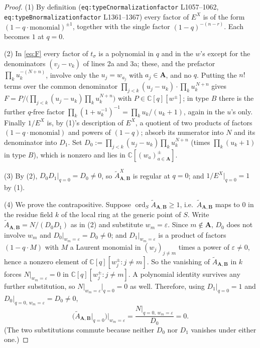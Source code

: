 \documentclass[11pt]{article}
\theoremstyle{plain}
\theoremstyle{definition}
\newcommand{\At}{\widetilde{A}}
\newcommand{\bA}{\mathbf{A}}
\newcommand{\bB}{\mathbf{B}}
\newcommand{\ord}{\operatorname{ord}}
\begin{document}
\begin{proof}
(1) By definition (\texttt{eq:typeCnormalizationfactor} L1057--1062,
\texttt{eq:typeBnormalizationfactor} L1361--1367) every factor of $E^{X}$ is of
the form $(1-q\cdot\text{monomial})^{\pm1}$, together with the single factor
$(1-q)^{-(n-r)}$.  Each becomes $1$ at $q=0$.

(2) In \eqref{eq:F} every factor of $t_\sigma$ is a polynomial in $q$ and in the
$w$'s except for the denominators $(v_j-v_k)$ of lines 2a and 3a; these, and the
prefactor $\prod_k u_k^{-(N+n)}$, involve only the $u_j=w_{a_j}$ with
$a_j\in\bA$, and no $q$.  Putting the $n!$ terms over the common denominator
$\prod_{j<k}(u_j-u_k)\cdot\prod_k u_k^{\,N+n}$ gives
$F=P/\bigl(\prod_{j<k}(u_j-u_k)\prod_k u_k^{N+n}\bigr)$ with
$P\in\mathbb{C}[q][w^{\pm}]$; in type $B$ there is the further $q$-free factor
$\prod_k(1+u_k^{-1})^{-1}=\prod_k u_k/(u_k+1)$, again in the $u$'s only.  Finally
$1/E^{X}$ is, by (1)'s description of $E^{X}$, a quotient of two products of
factors $(1-q\cdot\text{monomial})$ and powers of $(1-q)$; absorb its numerator
into $N$ and its denominator into $D_1$.  Set $D_0:=\prod_{j<k}(u_j-u_k)\prod_k
u_k^{N+n}$ (times $\prod_k(u_k+1)$ in type $B$), which is nonzero and lies in
$\mathbb{C}[(w_a)^{\pm}_{a\in\bA}]$.

(3) By (2), $D_0D_1|_{q=0}=D_0\ne0$, so $\At^{X}_{\bA,\bB}$ is regular at $q=0$;
and $1/E^{X}|_{q=0}=1$ by (1).

(4) We prove the contrapositive.  Suppose $\ord_S\At_{\bA,\bB}\ge1$, i.e.\
$\At_{\bA,\bB}$ maps to $0$ in the residue field $k$ of the local ring at the
generic point of $S$.  Write $\At_{\bA,\bB}=N/(D_0D_1)$ as in (2) and substitute
$w_m=\varepsilon$.  Since $m\notin\bA$, $D_0$ does not involve $w_m$ and
$D_0|_{w_m=\varepsilon}=D_0\ne0$; and $D_1|_{w_m=\varepsilon}$ is a product of
factors $(1-q\cdot M)$ with $M$ a Laurent monomial in $(w_j)_{j\ne m}$ times a
power of $\varepsilon\ne0$, hence a nonzero element of
$\mathbb{C}[q][w_j^{\pm}:j\ne m]$.  So the vanishing of $\At_{\bA,\bB}$ in $k$
forces $N|_{w_m=\varepsilon}=0$ in $\mathbb{C}[q][w_j^{\pm}:j\ne m]$.  A
polynomial identity survives any further substitution, so
$N|_{w_m=\varepsilon}\big|_{q=0}=0$ as well.  Therefore, using
$D_1|_{q=0}=1$ and $D_0|_{q=0,\,w_m=\varepsilon}=D_0\ne0$,
\[
  \bigl(\At_{\bA,\bB}\big|_{q=0}\bigr)\big|_{w_m=\varepsilon}
  =\frac{N\big|_{q=0,\,w_m=\varepsilon}}{D_0}
  =0 .
\]
(The two substitutions commute because neither $D_0$ nor $D_1$ vanishes under
either one.)
\end{proof}
\end{document}
